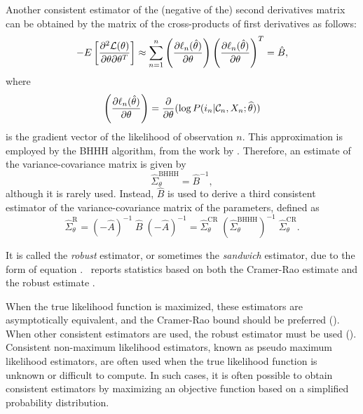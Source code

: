 \documentclass[12pt]{memoir}
\begin{document}
Another consistent estimator of the (negative of the) second
derivatives matrix can be obtained by the matrix of the cross-products of first derivatives as follows:
\begin{equation}
\label{eq:binaryBHHH}
-E\left[ \frac{\partial^2 \mathcal{L}(\theta)}{\partial \theta \partial \theta^T}\right] \approx  \sum_{n=1}^n \left(\frac{\partial \ell_n(\hat{\theta})}{\partial \theta} \right)\left(\frac{\partial \ell_n(\hat{\theta})}{\partial \theta} \right)^T = \hat{B},
\end{equation}
 where
\begin{equation}
\left(\frac{\partial \ell_n(\hat{\theta})}{\partial \theta} \right) = \frac{\partial}{\partial \theta} (\log P(i_n|\mathcal{C}_n,X_n;\widehat{\theta}))
\end{equation}
is the gradient vector of the likelihood of observation $n$.
This approximation is employed by the BHHH algorithm, from the work by . Therefore, an estimate of the variance-covariance matrix 
is given by 
\begin{equation}
\widehat{\Sigma}^{\text{BHHH}}_{\theta} =\hat{B}^{-1},
\end{equation}
 although it is rarely used. 
Instead, $\hat{B}$ is
used to derive  a third consistent estimator of the variance-covariance matrix of
the parameters, defined as
\begin{equation}
\label{eq:robustEstimator}
\widehat{\Sigma}^{\text{R}}_{\theta} = (-\hat{A})^{-1} \; \widehat{B}\; (-\hat{A})^{-1} = \widehat{\Sigma}^{\text{CR}}_{\theta} \; (\widehat{\Sigma}^{\text{BHHH}}_{\theta})^{-1} \; \widehat{\Sigma}^{\text{CR}}_{\theta}.
\end{equation}

It is
called the \emph{robust} estimator, or sometimes the \emph{sandwich}
estimator, due to the form of equation
. \BIOGEME\ reports statistics based on  both the Cramer-Rao estimate
 and the robust estimate .


 When the true likelihood function is maximized,  these estimators are
 asymptotically equivalent, and the Cramer-Rao bound should be
preferred (\cite{KaueCarr2001}).  When other consistent estimators are
used, the robust estimator must be used
(\cite{Whit82}). Consistent non-maximum likelihood estimators, known
as pseudo maximum likelihood estimators, are often used when the true
likelihood function is unknown or difficult to compute. In such cases,
it is often possible to obtain consistent estimators by maximizing an
objective function based on a simplified probability distribution. 
\end{document}
